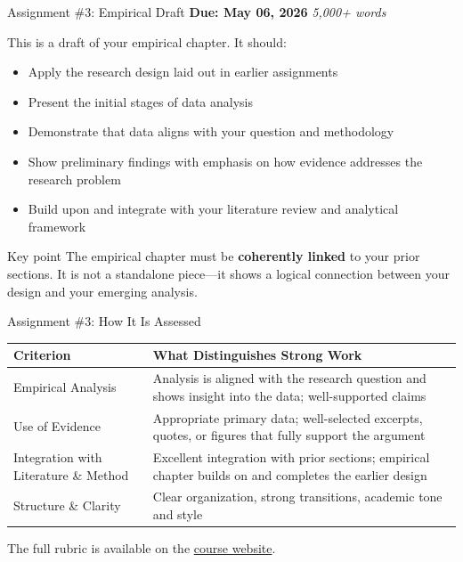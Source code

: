 \documentclass[aspectratio=169,11pt]{beamer}
\begin{document}
\begin{frame}{Assignment \#3: Empirical Draft}
    \textbf{Due: May 06, 2026} \hfill \textit{5,000+ words}
    \vspace{0.3cm}

    This is a draft of your empirical chapter. It should:
    \begin{itemize}
        \item Apply the research design laid out in earlier assignments
        \item Present the initial stages of data analysis
        \item Demonstrate that data aligns with your question and methodology
        \item Show preliminary findings with emphasis on how evidence addresses the research problem
        \item Build upon and integrate with your literature review and analytical framework
    \end{itemize}
    \vspace{0.3cm}
    \begin{block}{Key point}
        The empirical chapter must be \textbf{coherently linked} to your prior sections. It is not a standalone piece---it shows a logical connection between your design and your emerging analysis.
    \end{block}
\end{frame}

\begin{frame}{Assignment \#3: How It Is Assessed}
    \footnotesize
    \begin{table}
        \begin{tabular}{p{}p{}}
            \toprule
            \textbf{Criterion} & \textbf{What Distinguishes Strong Work} \\
            \midrule
            Empirical Analysis & Analysis is aligned with the research question and shows insight into the data; well-supported claims \\
            \addlinespace
            Use of Evidence & Appropriate primary data; well-selected excerpts, quotes, or figures that fully support the argument \\
            \addlinespace
            Integration with Literature \& Method & Excellent integration with prior sections; empirical chapter builds on and completes the earlier design \\
            \addlinespace
            Structure \& Clarity & Clear organization, strong transitions, academic tone and style \\
            \bottomrule
        \end{tabular}
    \end{table}
    \normalsize
    \vspace{0.3cm}
    The full rubric is available on the \textcolor{SlateBlue}{\href{https://scdenney.github.io/baks_thesis-seminar/assignments/}{course website}}.
\end{frame}
\end{document}
